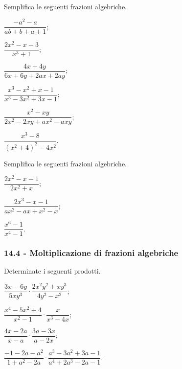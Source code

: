 \begin{esercizio}[\Ast]
\label{ese:14.11}
Semplifica le seguenti frazioni algebriche.
\begin{multicols}{3}
\begin{enumeratea}
 \item $\dfrac{-a^{2}-a}{ab+b+a+1}$;
 \item $\dfrac{2x^{2}-x-3}{x^{3}+1}$;
 \item $\dfrac{4x+4y}{6x+6y+2ax+2ay}$;
 \item $\dfrac{x^{3}-x^{2}+x-1}{x^{3}-3x^{2}+3x-1}$;
 \item $\dfrac{x^{2}-xy}{2x^{2}-2xy+ax^{2}-axy}$;
 \item $\dfrac{x^{3}-8}{\left(x^{2}+4\right)^{2}-4x^{2}}$.
\end{enumeratea}
\end{multicols}
\end{esercizio}

\begin{esercizio}[\Ast]
\label{ese:14.12}
Semplifica le seguenti frazioni algebriche.
\begin{multicols}{3}
\begin{enumeratea}
 \item $\dfrac{2x^{2}-x-1}{2x^{2}+x}$;
 \item $\dfrac{2x^{3}-x-1}{ax^{2}-ax+x^{2}-x}$;
 \item $\dfrac{x^{6}-1}{x^{4}-1}$.
\end{enumeratea}
\end{multicols}
\end{esercizio}

\subsubsection*{14.4 - Moltiplicazione di frazioni algebriche}

\begin{esercizio}[\Ast]
\label{ese:14.13}
Determinate i seguenti prodotti.
\begin{multicols}{2}
\begin{enumeratea}
 \item $\dfrac{3x-6y}{5xy^{3}}\cdot\dfrac{2x^{2}y^{2}+xy^{3}}{4y^{2}-x^{2}}$;
 \item $\dfrac{x^{4}-5x^{2}+4}{x^{2}-1}\cdot\dfrac{x}{x^{3}-4x}$;
 \item $\dfrac{4x-2a}{x-a}\cdot\dfrac{3a-3x}{a-2x}$;
 \item $\dfrac{-1-2a-a^{2}}{1+a^{2}-2a}\cdot\dfrac{a^{3}-3a^{2}+3a-1}{a^{4}+2a^{3}-2a-1}$.
\end{enumeratea}
\end{multicols}
\end{esercizio}

